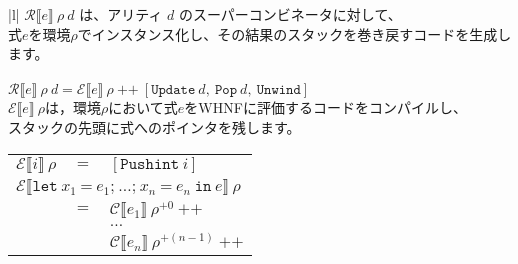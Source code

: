 \documentclass{jarticle}
\begin{document}
\begin{tabular} {|l|} \hline
	$\mathcal{R}\llbracket e \rrbracket ~ \rho ~ d$ は、アリティ $d$ のスーパーコンビネータに対して、                                                                          \\
	式$e$を環境$\rho$でインスタンス化し、その結果のスタックを巻き戻すコードを生成します。                                                                                      \\
	\\
	$\mathcal{R} \llbracket e \rrbracket ~ \rho ~ d = \mathcal{E} \llbracket e \rrbracket ~ \rho ~ \texttt{++} ~ [\texttt{Update} ~ d, ~ \texttt{Pop} ~ d, ~ \texttt{Unwind}]$ \\ \hline
	$\mathcal{E} \llbracket e \rrbracket ~ \rho$は，環境$\rho$において式$e$をWHNFに評価するコードをコンパイルし、                                                              \\
	スタックの先頭に式へのポインタを残します。                                                                                                                                 \\
	\begin{tabular}{r c l}
		$\mathcal{E} \llbracket i \rrbracket ~ \rho$                             & $=$ & $\left[\texttt{Pushint} ~ i \right]$                                                                                                                                                         \\
		\multicolumn{3}{l}{$\mathcal{E} \llbracket \texttt{let} ~ x_1 ~ \texttt{=} ~ e_1\texttt{;} ~  \ldots \texttt{;} ~ x_n ~ \texttt{=} ~ e_n ~ \texttt{in} ~ e \rrbracket ~ \rho$}                                                                                                \\
		                                                                         & $=$ & $\mathcal{C} \llbracket e_1 \rrbracket ~ \rho^{+0} ~ \texttt{++}$                                                                                                                            \\
		                                                                         &     & $\ldots$                                                                                                                                                                                     \\
		                                                                         &     & $\mathcal{C} \llbracket e_n \rrbracket ~ \rho^{+(n - 1)} ~ \texttt{++}$                                                                                                                      \\

\end{tabular}
\end{tabular}
\end{document}
